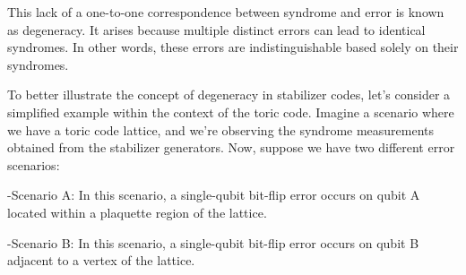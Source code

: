 \documentclass[12pt]{report}
\begin{document}
\begin{minipage}{1 \textwidth}
		This lack of a one-to-one correspondence between syndrome and error is known as degeneracy. It arises because multiple distinct errors can lead to identical syndromes. In other words, these errors are indistinguishable based solely on their syndromes. \newline
		
		To better illustrate the concept of degeneracy in stabilizer codes, let's consider a simplified example within the context of the toric code.
		Imagine a scenario where we have a toric code lattice, and we're observing the syndrome measurements obtained from the stabilizer generators. Now, suppose we have two different error scenarios: \newline
		
		-Scenario A: In this scenario, a single-qubit bit-flip error occurs on qubit A located within a plaquette region of the lattice. \newline
		
		-Scenario B: In this scenario, a single-qubit bit-flip error occurs on qubit B adjacent to a vertex of the lattice. \newline
		
		
		
		
	\end{minipage}
	
\end{document}
